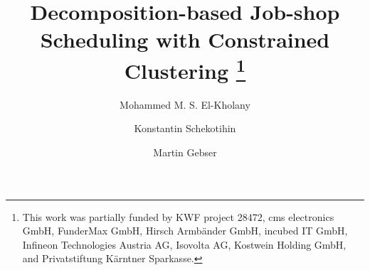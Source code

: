 \documentclass[runningheads]{llncs}
\begin{document}
%
\title{Decomposition-based Job-shop Scheduling with Constrained Clustering
\thanks{This work was partially funded by
KWF project 28472,
cms electronics GmbH,
FunderMax GmbH,
Hirsch Armbänder GmbH,
incubed IT GmbH,
Infineon Technologies Austria AG,
Isovolta AG,
Kostwein Holding GmbH, and
Privatstiftung Kärntner Sparkasse.}}%
%
%
\author{Mohammed M. S. El-Kholany \and
Konstantin Schekotihin \and
Martin Gebser}
%
%
%
\maketitle              %
%
\end{document}
